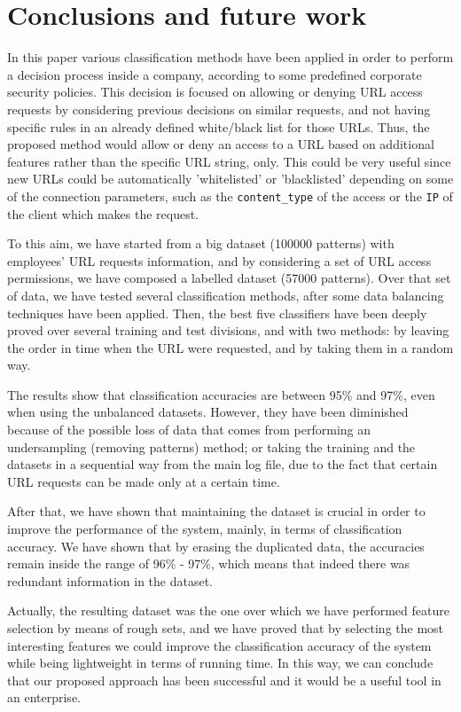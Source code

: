 \documentclass{llncs}
\begin{document}
\section{Conclusions and future work}
\label{sec:conclusions}
In this paper various classification methods have been applied in order to perform a decision process inside a company,
according to some predefined corporate security policies. This decision is focused on allowing or denying URL access
requests by considering previous decisions on similar requests, and not having specific rules in an already defined
white/black list for those URLs. Thus, the proposed method would allow or deny an access to a URL based on additional
features rather than the specific URL string, only. This could be very useful since new URLs could be
automatically 'whitelisted' or 'blacklisted' depending on some of the connection parameters,
such as the \texttt{content\_type} of the access or the \texttt{IP} of the client which makes the request.

To this aim, we have started from a big dataset (100000 patterns) with employees' URL requests information,
and by considering a set of URL access permissions, we have composed a labelled dataset (57000 patterns).
Over that set of data, we have tested several classification methods, after some data balancing techniques
have been applied. Then, the best five classifiers have been deeply proved over several training and test divisions,
and with two methods: by leaving the order in time when the URL were requested, and by taking them in a random way.

The results show that classification accuracies are between 95\% and 97\%, even when using the unbalanced datasets.
However, they have been diminished because of the possible loss of data that comes from performing an undersampling
(removing patterns) method; or taking the training and the datasets in a sequential way from the main log file,
due to the fact that certain URL requests can be made only at a certain time.

After that, we have shown that maintaining the dataset is crucial in order to improve the performance of
the system, mainly, in terms of classification accuracy. We have shown that by erasing the duplicated data,
the accuracies remain inside the range of 96\% - 97\%, which means that indeed there was redundant information
in the dataset.

Actually, the resulting dataset was the one over which we have performed feature selection by means of rough sets,
and we have proved that by selecting the most interesting features we could improve the classification accuracy of
the system while being lightweight in terms of running time. In this way, we can conclude that our proposed approach
has been successful and it would be a useful tool in an enterprise.
\end{document}
